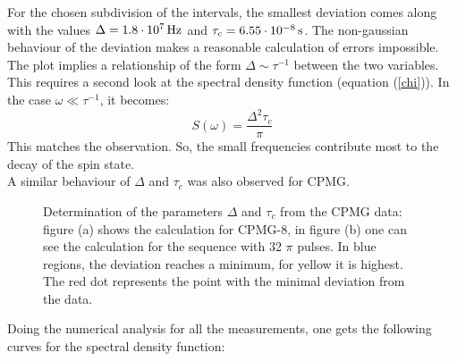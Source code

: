 \documentclass[12pt,a4paper]{article}
\begin{document}
For the chosen subdivision of the intervals, the smallest deviation comes along with the values $\Delta=\unit[1.8\cdot 10^7]{Hz}$ and $\tau_c=\unit[6.55\cdot 10^{-8}]{s}$. The non-gaussian behaviour of the deviation makes a reasonable calculation of errors impossible.\\
The plot implies a relationship of the form $\Delta\sim\tau^{-1}$ between the two variables. This requires a second look at the spectral density function (equation (\ref{chi})). In the case $\omega\ll\tau^{-1}$, it becomes:
\begin{equation}\label{limit}
S(\omega)=\frac{\Delta^2\tau_c}{\pi}
\end{equation}
This matches the observation. So, the small frequencies contribute most to the decay of the spin state.\\
A similar behaviour of $\Delta$ and $\tau_c$ was also observed for CPMG.
\begin{figure}[H]\label{C} 
    \caption{Determination of the parameters $\Delta$ and $\tau_c$ from the CPMG data: figure (a) shows the calculation for CPMG-8, in figure (b) one can see the calculation for the sequence with 32 $\pi$ pulses. In blue regions, the deviation reaches a minimum, for yellow it is highest. The red dot represents the point with the minimal deviation from the data.}
\end{figure}
Doing the numerical analysis for all the measurements, one gets the following curves for the spectral density function:
\end{document}
